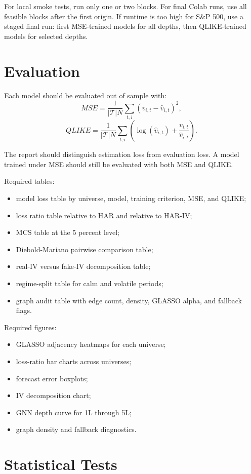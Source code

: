 \documentclass[11pt,a4paper]{article}
\begin{document}
For local smoke tests, run only one or two blocks. For final Colab runs, use all feasible blocks after the first origin. If runtime is too high for S\&P 500, use a staged final run: first MSE-trained models for all depths, then QLIKE-trained models for selected depths.

\section{Evaluation}

Each model should be evaluated out of sample with:
\[
MSE=\frac{1}{|\mathcal{T}|N}\sum_{t,i}(v_{i,t}-\widehat{v}_{i,t})^2,
\]
\[
QLIKE=\frac{1}{|\mathcal{T}|N}\sum_{t,i}
\left(
\log(\widehat{v}_{i,t})
+\frac{v_{i,t}}{\widehat{v}_{i,t}}
\right).
\]

The report should distinguish estimation loss from evaluation loss. A model trained under MSE should still be evaluated with both MSE and QLIKE.

Required tables:
\begin{itemize}[leftmargin=*]
  \item model loss table by universe, model, training criterion, MSE, and QLIKE;
  \item loss ratio table relative to HAR and relative to HAR-IV;
  \item MCS table at the 5 percent level;
  \item Diebold-Mariano pairwise comparison table;
  \item real-IV versus fake-IV decomposition table;
  \item regime-split table for calm and volatile periods;
  \item graph audit table with edge count, density, GLASSO alpha, and fallback flags.
\end{itemize}

Required figures:
\begin{itemize}[leftmargin=*]
  \item GLASSO adjacency heatmaps for each universe;
  \item loss-ratio bar charts across universes;
  \item forecast error boxplots;
  \item IV decomposition chart;
  \item GNN depth curve for 1L through 5L;
  \item graph density and fallback diagnostics.
\end{itemize}

\section{Statistical Tests}
\end{document}

